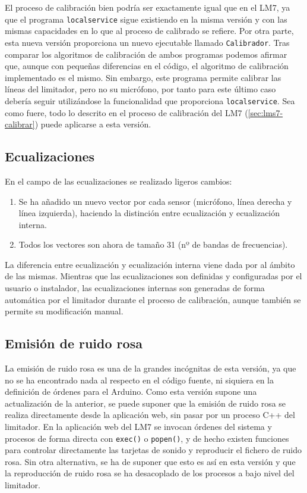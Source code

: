 El proceso de calibración bien podría ser exactamente igual que en el LM7, ya que el programa \verb|localservice| sigue existiendo en la misma versión y con las mismas capacidades en lo que al proceso de calibrado se refiere. Por otra parte, esta nueva versión proporciona un nuevo ejecutable llamado \verb|Calibrador|. Tras comparar los algoritmos de calibración de ambos programas podemos afirmar que, aunque con pequeñas diferencias en el código, el algoritmo de calibración implementado es el mismo. Sin embargo, este programa permite calibrar las líneas del limitador, pero no su micrófono, por tanto para este último caso debería seguir utilizándose la funcionalidad que proporciona \verb|localservice|. Sea como fuere, todo lo descrito en el proceso de calibración del LM7 (\ref{sec:lms7-calibrar}) puede aplicarse a esta versión.

\subsection{Ecualizaciones}

En el campo de las ecualizaciones se realizado ligeros cambios:
\begin{enumerate}
	\item Se ha añadido un nuevo vector por cada sensor (micrófono, línea derecha y línea izquierda), haciendo la distinción entre ecualización y ecualización interna.

	\item Todos los vectores son ahora de tamaño 31 (nº de bandas de frecuencias).
\end{enumerate}

La diferencia entre ecualización y ecualización interna viene dada por al ámbito de las mismas. Mientras que las ecualizaciones son definidas y configuradas por el usuario o instalador, las ecualizaciones internas son generadas de forma automática por el limitador durante el proceso de calibración, aunque también se permite su modificación manual.

\subsection{Emisión de ruido rosa}

La emisión de ruido rosa es una de la grandes incógnitas de esta versión, ya que no se ha encontrado nada al respecto en el código fuente, ni siquiera en la definición de órdenes para el Arduino. Como esta versión supone una actualización de la anterior, se puede suponer que la emisión de ruido rosa se realiza directamente desde la aplicación web, sin pasar por un proceso C++ del limitador. En la aplicación web del LM7 se invocan órdenes del sistema y procesos de forma directa con \verb|exec()| o \verb|popen()|, y de hecho existen funciones para controlar directamente las tarjetas de sonido y reproducir el fichero de ruido rosa. Sin otra alternativa, se ha de suponer que esto es así en esta versión y que la reproducción de ruido rosa se ha desacoplado de los procesos a bajo nivel del limitador.

